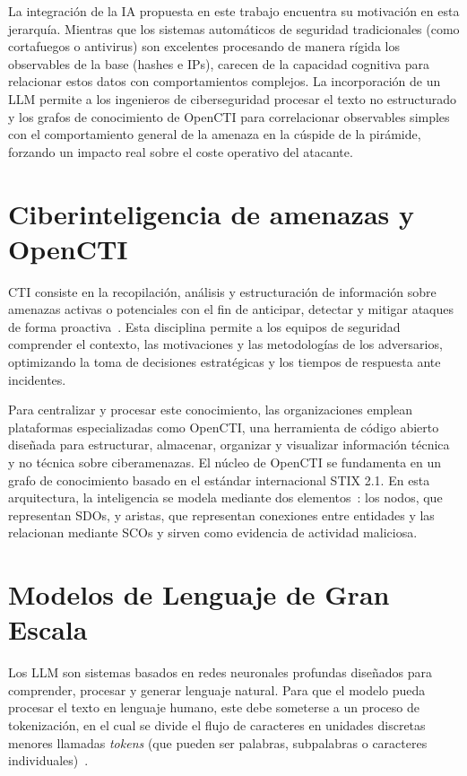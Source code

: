 \documentclass[12pt]{report}
\begin{document}
La integración de la IA propuesta en este trabajo encuentra su motivación en esta jerarquía. Mientras que los sistemas automáticos de seguridad tradicionales (como cortafuegos o antivirus) son excelentes procesando de manera rígida los observables de la base (hashes e IPs), carecen de la capacidad cognitiva para relacionar estos datos con comportamientos complejos. La incorporación de un LLM permite a los ingenieros de ciberseguridad procesar el texto no estructurado y los grafos de conocimiento de OpenCTI para correlacionar observables simples con el comportamiento general de la amenaza en la cúspide de la pirámide, forzando un impacto real sobre el coste operativo del atacante.

\section{Ciberinteligencia de amenazas y OpenCTI}
CTI consiste en la recopilación, análisis y estructuración de información sobre amenazas activas o potenciales con el fin de anticipar, detectar y mitigar ataques de forma proactiva~\cite{santos2025}. Esta disciplina permite a los equipos de seguridad comprender el contexto, las motivaciones y las metodologías de los adversarios, optimizando la toma de decisiones estratégicas y los tiempos de respuesta ante incidentes.

Para centralizar y procesar este conocimiento, las organizaciones emplean plataformas especializadas como OpenCTI, una herramienta de código abierto diseñada para estructurar, almacenar, organizar y visualizar información técnica y no técnica sobre ciberamenazas. El núcleo de OpenCTI se fundamenta en un grafo de conocimiento basado en el estándar internacional STIX 2.1. En esta arquitectura, la inteligencia se modela mediante dos elementos~\cite{openctidata}: los nodos, que representan SDOs, y aristas, que representan conexiones entre entidades y las relacionan mediante SCOs y sirven como evidencia de actividad maliciosa.

\section{Modelos de Lenguaje de Gran Escala}
Los LLM son sistemas basados en redes neuronales profundas diseñados para comprender, procesar y generar lenguaje natural. Para que el modelo pueda procesar el texto en lenguaje humano, este debe someterse a un proceso de tokenización, en el cual se divide el flujo de caracteres en unidades discretas menores llamadas \textit{tokens} (que pueden ser palabras, subpalabras o caracteres individuales)~\cite{jm3}.
\end{document}
